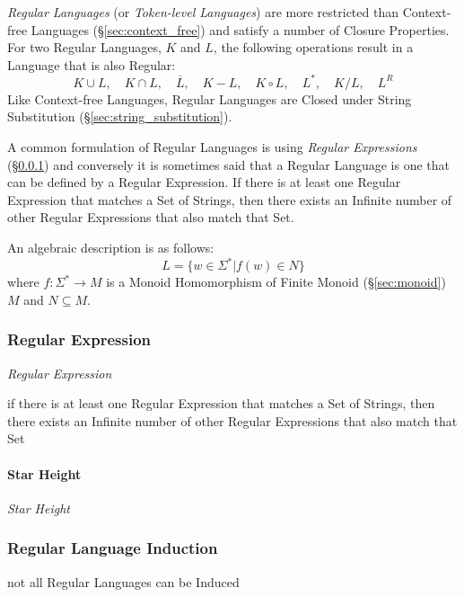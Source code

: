 \emph{Regular Languages} (or \emph{Token-level Languages}) are more restricted
than Context-free Languages (\S\ref{sec:context_free}) and satisfy a number of
Closure Properties. For two Regular Languages, $K$ and $L$, the following
operations result in a Language that is also Regular:
\[
  K \cup L, \quad
  K \cap L, \quad
  \overline{L}, \quad
  K - L, \quad
  K \circ L, \quad
  L^*, \quad
  K / L, \quad
  L^R
\]
Like Context-free Languages, Regular Languages are Closed under String
Substitution (\S\ref{sec:string_substitution}).

A common formulation of Regular Languages is using \emph{Regular Expressions}
(\S\ref{sec:regular_expression}) and conversely it is sometimes said that a
Regular Language is one that can be defined by a Regular Expression. If there is
at least one Regular Expression that matches a Set of Strings, then there exists
an Infinite number of other Regular Expressions that also match that Set.

An algebraic description is as follows:
\[
  L = \{ w \in \Sigma^* | f(w) \in N \}
\]
where $f : \Sigma^* \rightarrow M$ is a Monoid Homomorphism of Finite Monoid
(\S\ref{sec:monoid}) $M$ and $N \subseteq M$.



\subsubsection{Regular Expression}\label{sec:regular_expression}

\emph{Regular Expression}

if there is at least one Regular Expression that matches a Set of Strings, then
there exists an Infinite number of other Regular Expressions that also match
that Set



\paragraph{Star Height}\label{sec:star_height}\hfill

\emph{Star Height}



\subsubsection{Regular Language Induction}
\label{sec:regular_language_induction}

not all Regular Languages can be Induced



